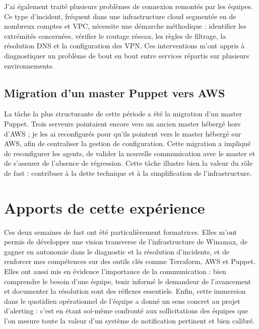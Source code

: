 J'ai également traité plusieurs problèmes de connexion remontés par les équipes. Ce type d'incident,
fréquent dans une infrastructure cloud segmentée en de nombreux comptes et VPC, nécessite une
démarche méthodique : identifier les extrémités concernées, vérifier le routage réseau, les règles de
filtrage, la résolution DNS et la configuration des VPN. Ces interventions m'ont appris à diagnostiquer
un problème de bout en bout entre services répartis sur plusieurs environnements.

\subsection{Migration d'un master Puppet vers AWS}

La tâche la plus structurante de cette période a été la migration d'un master Puppet. Trois serveurs
pointaient encore vers un ancien master hébergé hors d'AWS ; je les ai reconfigurés pour qu'ils
pointent vers le master hébergé sur AWS, afin de centraliser la gestion de configuration. Cette
migration a impliqué de reconfigurer les agents, de valider la nouvelle communication avec le master
et de s'assurer de l'absence de régression. Cette tâche illustre bien la valeur du rôle de fast :
contribuer à la dette technique et à la simplification de l'infrastructure.

\section{Apports de cette expérience}

Ces deux semaines de fast ont été particulièrement formatrices. Elles m'ont permis de développer une
vision transverse de l'infrastructure de Winamax, de gagner en autonomie dans le diagnostic et la
résolution d'incidents, et de renforcer mes compétences sur des outils clés comme Terraform, AWS
et Puppet. Elles ont aussi mis en évidence l'importance de la communication : bien comprendre le
besoin d'une équipe, tenir informé le demandeur de l'avancement et documenter la résolution sont
des réflexes essentiels. Enfin, cette immersion dans le quotidien opérationnel de l'équipe a donné un
sens concret au projet d'alerting : c'est en étant soi-même confronté aux sollicitations des équipes
que l'on mesure toute la valeur d'un système de notification pertinent et bien calibré.
